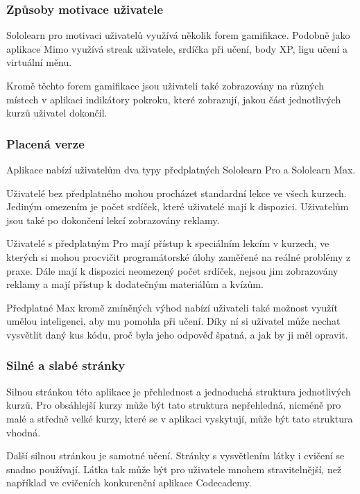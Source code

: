 \subsubsection{Způsoby motivace uživatele}

Sololearn pro motivaci uživatelů využívá několik forem gamifikace. Podobně jako aplikace Mimo využívá streak uživatele, srdíčka při učení, body XP, ligu učení a virtuální měnu.

Kromě těchto forem gamifikace jsou uživateli také zobrazovány na různých místech v aplikaci indikátory pokroku, které zobrazují, jakou část jednotlivých kurzů uživatel dokončil.

\subsubsection{Placená verze}

Aplikace nabízí uživatelům dva typy předplatných Sololearn Pro a Sololearn Max.

Uživatelé bez předplatného mohou procházet standardní lekce ve všech kurzech. Jediným omezením je počet srdíček, které uživatelé mají k dispozici. Uživatelům jsou také po dokončení lekcí zobrazovány reklamy.

Uživatelé s předplatným Pro mají přístup k speciálním lekcím v kurzech, ve kterých si mohou procvičit programátorské úlohy zaměřené na reálné problémy z praxe. Dále mají k dispozici neomezený počet srdíček, nejsou jim zobrazovány reklamy a mají přístup k dodatečným materiálům a kvízům.

Předplatné Max kromě zmíněných výhod nabízí uživateli také možnost využít umělou inteligenci, aby mu pomohla při učení. Díky ní si uživatel může nechat vysvětlit daný kus kódu, proč byla jeho odpověď špatná, a jak by ji měl opravit.

\subsubsection{Silné a slabé stránky}

Silnou stránkou této aplikace je přehlednost a jednoduchá struktura jednotlivých kurzů. Pro obsáhlejší kurzy může být tato struktura nepřehledná, nicméně pro malé a středně velké kurzy, které se v aplikaci vyskytují, může být tato struktura vhodná.

Další silnou stránkou je samotné učení. Stránky s vysvětlením látky i cvičení se snadno používají. Látka tak může být pro uživatele mnohem stravitelnější, než například ve cvičeních konkurenční aplikace Codecademy.

